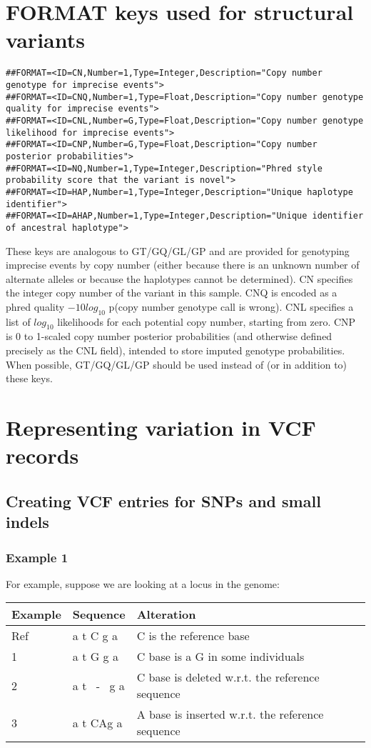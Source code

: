 \documentclass[8pt]{article}
\begin{document}
\section{FORMAT keys used for structural variants}
\label{sv-format-keys}
\footnotesize
\begin{verbatim}
##FORMAT=<ID=CN,Number=1,Type=Integer,Description="Copy number genotype for imprecise events">
##FORMAT=<ID=CNQ,Number=1,Type=Float,Description="Copy number genotype quality for imprecise events">
##FORMAT=<ID=CNL,Number=G,Type=Float,Description="Copy number genotype likelihood for imprecise events">
##FORMAT=<ID=CNP,Number=G,Type=Float,Description="Copy number posterior probabilities">
##FORMAT=<ID=NQ,Number=1,Type=Integer,Description="Phred style probability score that the variant is novel">
##FORMAT=<ID=HAP,Number=1,Type=Integer,Description="Unique haplotype identifier">
##FORMAT=<ID=AHAP,Number=1,Type=Integer,Description="Unique identifier of ancestral haplotype">
\end{verbatim}
\normalsize
These keys are analogous to GT/GQ/GL/GP and are provided for genotyping
imprecise events by copy number (either because there is an unknown number of
alternate alleles or because the haplotypes cannot be determined). CN specifies
the integer copy number of the variant in this sample. CNQ is encoded as a
phred quality $-10log_{10}$ p(copy number genotype call is wrong). CNL
specifies a list of $log_{10}$ likelihoods for each potential copy number,
starting from zero. CNP is 0 to 1-scaled copy number posterior
probabilities (and otherwise defined precisely as the CNL field), intended to
store imputed genotype probabilities. When possible, GT/GQ/GL/GP should be used
instead of (or in addition to) these keys.

\section{Representing variation in VCF records}
\subsection{Creating VCF entries for SNPs and small indels}
\subsubsection{Example 1}
For example, suppose we are looking at a locus in the genome:

\vspace{0.3cm}
\begin{tabular}{ | l | l | l | }
\hline
Example & Sequence & Alteration \\ \hline
Ref & a t C g a & C is the reference base \\ \hline
1   & a t G g a & C base is a G in some individuals \\ \hline
2   & a t \ - \ g a & C base is deleted w.r.t. the reference sequence\\ \hline
3   & a t CAg a & A base is inserted w.r.t. the reference sequence \\ \hline
\end{tabular}
\vspace{0.3cm}
\end{document}
